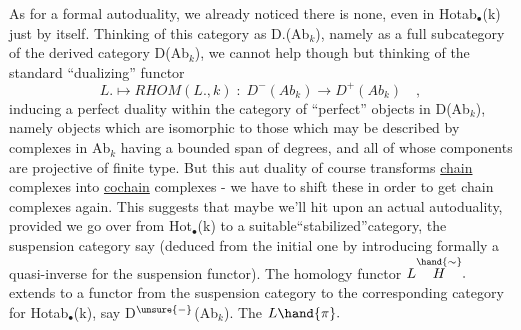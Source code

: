 As for a formal autoduality,
we already noticed there is none, even in Hotab$_{\bullet}$(k) just by itself.
Thinking of this category as D.(Ab$_{k}$), namely as a full subcategory of
the derived category D(Ab$_{k}$), we cannot help though but thinking of
the standard ``dualizing'' functor
\[ L. \longmapsto RHOM(L.,k) \;:\; D^{-}(Ab_{k}) \longrightarrow D^{+}(Ab_{k}) \quad , \]
inducing a perfect duality  within the category of ``perfect''
objects in D(Ab$_{k}$), namely objects which are isomorphic to those which
may be described by complexes in Ab$_{k}$ having a bounded span of degrees,
and all of whose components are projective of finite type. But this aut
duality of course transforms \uline{chain} complexes into \uline{cochain} complexes
- we have to shift these in order to get chain complexes again. This
suggests that maybe we'll hit upon  an actual autoduality,
provided we go over from Hot$_{\bullet}$(k) to a suitable``stabilized''category,
the suspension category say (deduced from the initial one by 
introducing formally a quasi-inverse for the suspension functor). The
homology functor $L\overset{\hand{\sim}}{H}.$ extends to a functor from the suspension category
to the corresponding category for Hotab$_{\bullet}$(k), say D$^{\unsure{-}}$(Ab$_{k}$). The $L\hand{\pi}.$

